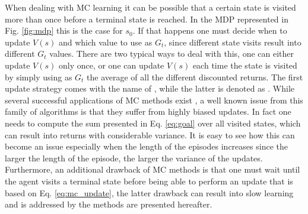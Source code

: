 When dealing with MC learning it can be possible that a certain state is visited more than once before a terminal state is reached. In the MDP represented in Fig. \ref{fig:mdp} this is the case for $s_0$. If that happens one must decide when to update $V(s)$ and which value to use as $G_t$, since different state visits result into different $G_t$ values. There are two typical ways to deal with this, one can either update $V(s)$ only once, or one can update $V(s)$ each time the state is visited by simply using as $G_t$ the average of all the different discounted returns. The first update strategy comes with the name of , while the latter is denoted as .
While several successful applications of MC methods exist \cite{jaakkola1995reinforcement,liu1998sequential,lazaric2007reinforcement}, a well known issue from this family of algorithms is that they suffer from highly biased updates. In fact one needs to compute the sum presented in Eq. \ref{eq:goal} over all visited states, which can result into returns with considerable variance. It is easy to see how this can become an issue especially when the length of the episodes increases since the larger the length of the episode, the larger the variance of the updates. Furthermore, an additional drawback of MC methods is that one must wait until the agent visits a terminal state before being able to perform an update that is based on Eq. \ref{eq:mc_update}, the latter drawback can result into slow learning and is addressed by the methods are presented hereafter.   

